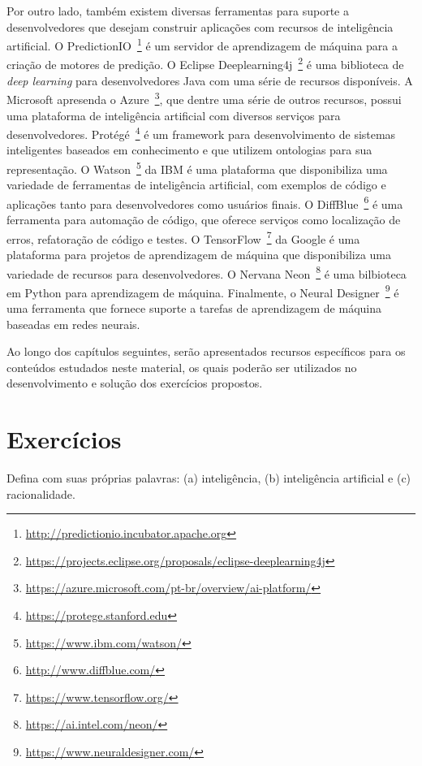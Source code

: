 Por outro lado, também existem diversas ferramentas para suporte a desenvolvedores que desejam construir aplicações com recursos de inteligência artificial. O PredictionIO~\footnote{\url{http://predictionio.incubator.apache.org}} é um servidor de aprendizagem de máquina para a criação de motores de predição. O Eclipse Deeplearning4j~\footnote{\url{https://projects.eclipse.org/proposals/eclipse-deeplearning4j}} é uma biblioteca de \textit{deep learning} para desenvolvedores Java com uma série de recursos disponíveis. A Microsoft apresenda o Azure~\footnote{\url{https://azure.microsoft.com/pt-br/overview/ai-platform/}}, que dentre uma série de outros recursos, possui uma plataforma de inteligência artificial com diversos serviços para desenvolvedores. Protégé~\footnote{\url{https://protege.stanford.edu}} é um framework para desenvolvimento de sistemas inteligentes baseados em conhecimento e que utilizem ontologias para sua representação. O Watson~\footnote{\url{https://www.ibm.com/watson/}} da IBM é uma plataforma que disponibiliza uma variedade de ferramentas de inteligência artificial, com exemplos de código e aplicações tanto para desenvolvedores como usuários finais. O DiffBlue~\footnote{\url{http://www.diffblue.com/}} é uma ferramenta para automação de código, que oferece serviços como localização de erros, refatoração de código e testes. O TensorFlow~\footnote{\url{https://www.tensorflow.org/}} da Google é uma plataforma para projetos de aprendizagem de máquina que disponibiliza uma variedade de recursos para desenvolvedores. O Nervana Neon~\footnote{\url{https://ai.intel.com/neon/}} é uma bilbioteca em Python para aprendizagem de máquina. Finalmente, o Neural Designer~\footnote{\url{https://www.neuraldesigner.com/}} é uma ferramenta que fornece suporte a tarefas de aprendizagem de máquina baseadas em redes neurais.

Ao longo dos capítulos seguintes, serão apresentados recursos específicos para os conteúdos estudados neste material, os quais poderão ser utilizados no desenvolvimento e solução dos exercícios propostos.

\section{Exercícios}

\begin{exercise}
Defina com suas próprias palavras: (a) inteligência, (b) inteligência artificial e (c) racionalidade.
\end{exercise}

